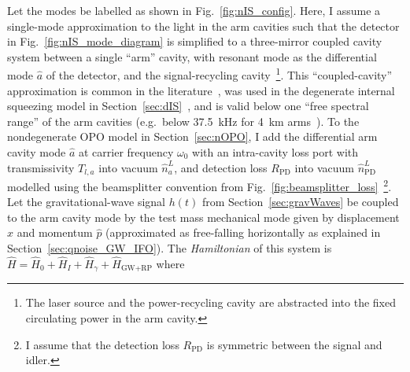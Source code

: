 Let the modes be labelled as shown in Fig.~\ref{fig:nIS_config}. 
Here, I assume a single-mode approximation to the light in the arm cavities such that the detector in Fig.~\ref{fig:nIS_mode_diagram} is simplified to a three-mirror coupled cavity system between a single ``arm'' cavity, with resonant mode as the differential mode $\hat a$ of the detector, and the signal-recycling cavity~\footnote{The laser source and the power-recycling cavity are abstracted into the fixed circulating power in the arm cavity.}. This ``coupled-cavity'' approximation is common in the literature~\cite{adyaQuantumEnhancedKHz2020,liBroadbandSensitivityImprovement2020,miaoEnhancingBandwidthGravitationalWave2015}, was used in the degenerate internal squeezing model in Section~\ref{sec:dIS}~\cite{korobkoQuantumExpanderGravitationalwave2019}, and is valid below one ``free spectral range'' of the arm cavities (e.g.\ below 37.5~kHz for 4~km arms~\cite{miaoEnhancingBandwidthGravitationalWave2015}).
To the nondegenerate OPO model in Section~\ref{sec:nOPO}, I add the differential arm cavity mode $\hat a$ at carrier frequency $\omega_0$ with an intra-cavity loss port with transmissivity $T_{l,a}$ into vacuum $\hat n^L_a$, and detection loss $R_\text{PD}$ into vacuum $\hat n^L_\text{PD}$ modelled using the beamsplitter convention from Fig.~\ref{fig:beamsplitter_loss}~\footnote{I assume that the detection loss $R_\text{PD}$ is symmetric between the signal and idler.}. Let the gravitational-wave signal $h(t)$ from Section~\ref{sec:gravWaves} be coupled to the arm cavity mode by the test mass mechanical mode given by displacement $\hat x$ and momentum $\hat p$ (approximated as free-falling horizontally as explained in Section~\ref{sec:qnoise_GW_IFO}).
The \emph{Hamiltonian} of this system is $\hat H = \hat H_0 + \hat H_I + \hat H_\gamma + \hat H_\text{GW+RP}$ where~\cite{liBroadbandSensitivityImprovement2020} 
